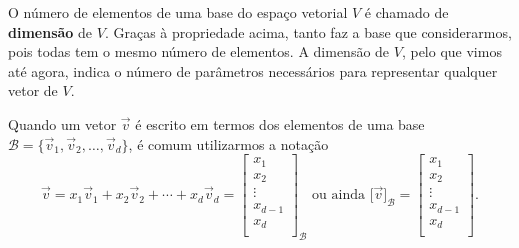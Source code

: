 O número de elementos de uma base do espaço vetorial $V$ é chamado de \textbf{dimensão} de $V$. Graças à propriedade acima, tanto faz a base que considerarmos, pois todas tem o mesmo número de elementos. A dimensão de $V$, pelo que vimos até agora, indica o número de parâmetros necessários para representar qualquer vetor de $V$.

Quando um vetor $\vec{v}$ é escrito em termos dos elementos de uma base $\mathcal{B} = \{\vec{v}_1, \vec{v}_2, \dots, \vec{v}_d\}$, é comum utilizarmos a notação
\begin{equation}
\vec{v} = x_1 \vec{v}_1 + x_2 \vec{v}_2 + \cdots  + x_d \vec{v}_d =
\left[
\begin{array}{c}
x_1 \\
x_2 \\
\vdots \\
x_{d-1} \\
x_d \\
\end{array}
\right]_{\mathcal{B}} \text{ ou ainda } \big[ \vec{v} \big]_{\mathcal{B}} =
\left[
\begin{array}{c}
x_1 \\
x_2 \\
\vdots \\
x_{d-1} \\
x_d \\
\end{array}
\right].
\end{equation}

